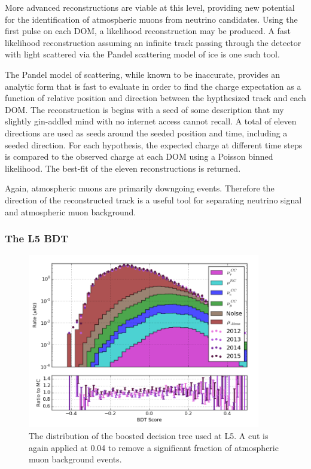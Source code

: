 More advanced reconstructions are viable at this level, providing new potential for the identification of atmospheric muons from neutrino candidates.
Using the first pulse on each DOM, a likelihood reconstruction may be produced.
A fast likelihood reconstruction assuming an infinite track passing through the detector with light scattered via the Pandel scattering model of ice is one such tool.

The Pandel model of scattering, while known to be inaccurate, provides an analytic form that is fast to evaluate in order to find the charge expectation as a function of relative position and direction between the hypthesized track and each DOM.
The reconstruction is begins with a seed of some description that my slightly gin-addled mind with no internet access cannot recall.
A total of eleven directions are used as seeds around the seeded position and time, including a seeded direction.
For each hypothesis, the expected charge at different time steps is compared to the observed charge at each DOM using a Poisson binned likelihood.
The best-fit of the eleven reconstructions is returned.

Again, atmospheric muons are primarily downgoing events. 
Therefore the direction of the reconstructed track is a useful tool for separating neutrino signal and atmospheric muon background.


\subsubsection{The L5 BDT}
\begin{figure}[h]
	\centering
		\includegraphics[width=4in]{BDT_Score_log.png}
		\caption[The L5 BDT Score]{The distribution of the boosted decision tree used at L5. A cut is again applied at 0.04 to remove a significant fraction of atmospheric muon background events.}
	\label{fig:L5_bdt_log}
\end{figure}

